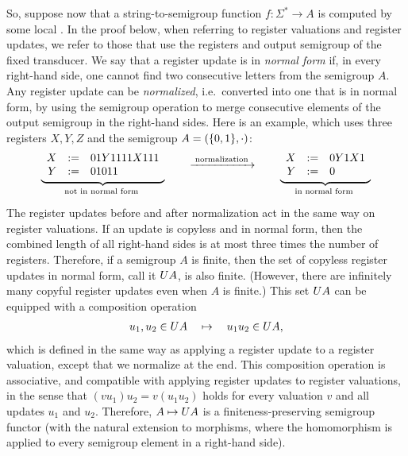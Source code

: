 So, suppose now that a string-to-semigroup function $f\colon \Sigma^* \to A$ is
computed by some local \sst. In the proof below, when referring to register valuations and register updates, we refer to those that use the registers and output semigroup of the fixed transducer. We say that a register update is in \emph{normal form} if, in every right-hand side, one cannot find two consecutive letters from the semigroup $A$.
Any register update can be \emph{normalized}, i.e.~converted into one that is in normal form, by using the semigroup operation to merge consecutive elements of the output semigroup in the right-hand sides.
Here is an example, which uses three registers $X,Y,Z$ and the semigroup $A = (\{0,1\}, \cdot)$:
\begin{align*}
  \myunderbrace{
  \begin{array}{rcl}
    X &:=& 01Y1111X111\\
    Y &:=& 01011
  \end{array}
  }{not in normal form}
  \qquad \xrightarrow{\;\text{normalization}\;} \qquad
  \myunderbrace{
  \begin{array}{rcl}
    X &:=& 0Y1X1\\
    Y &:=& 0
  \end{array}
  }{in normal form}
\end{align*}
The register updates before and after normalization act in the same way on
register valuations. If an update is copyless and in normal form, then the
combined length of all right-hand sides is at most three times the number of
registers. Therefore, if a semigroup $A$ is finite, then the set of copyless
register updates in normal form, call it $\functoru A$, is also finite.
(However, there are infinitely many copyful register updates even when $A$ is
finite.) This set $\functoru A$ can be equipped with a composition operation
\begin{align*}
    u_1,u_2 \in \functoru A  \quad \mapsto \quad u_1u_2 \in \functoru A,
\end{align*}
which is defined in the same way as applying a register update to a register
valuation, except that we normalize at the end. This composition operation is
associative, and  compatible with applying register updates to register
valuations, in the sense that $(vu_1)u_2 = v(u_1u_2)$ holds for every valuation
$v$ and all updates $u_1$ and $u_2$. Therefore, $A \mapsto \functoru A$ is a finiteness-preserving semigroup functor (with the natural extension to morphisms, where the homomorphism is applied to every semigroup element in a right-hand side). 


